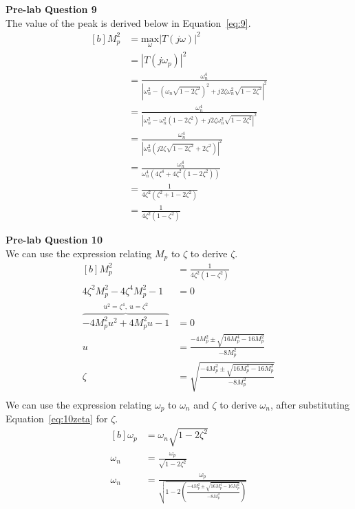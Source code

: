 \documentclass[12pt]{article}
\begin{document}
\textbf{Pre-lab Question 9} \\
The value of the peak is derived below in Equation~\ref{eq:9}.
\begin{equation} \label{eq:9}
\begin{aligned}[b]
    M_p^2 &= \underset{\omega}{\text{max}}\left| T(j\omega) \right|^2 \\
    &= \left| T(j\omega_p) \right|^2 \\
    &= \frac{\omega_n^4}{\left| \omega_n^2 - (\omega_n\sqrt{1-2\zeta^2})^2 + j2\zeta\omega_n^2\sqrt{1-2\zeta^2} \right|^2} \\
    &= \frac{\omega_n^4}{\left| \omega_n^2 - \omega_n^2(1-2\zeta^2) + j2\zeta\omega_n^2\sqrt{1-2\zeta^2} \right|^2} \\
    &= \frac{\omega_n^4}{\left| \omega_n^2 \left( j2\zeta\sqrt{1-2\zeta^2} + 2\zeta^2 \right) \right|^2} \\
    &= \frac{\omega_n^4}{\omega_n^4 (4\zeta^4 + 4\zeta^2 (1-2\zeta^2))} \\
    &= \frac{1}{4\zeta^2 (\zeta^2 + 1 - 2\zeta^2)} \\
    &= \frac{1}{4\zeta^2 (1 - \zeta^2)}
\end{aligned}
\end{equation}

\textbf{Pre-lab Question 10} \\
We can use the expression relating $M_p$ to $\zeta$ to derive $\zeta$.
\begin{equation} \label{eq:10zeta}
\begin{aligned}[b]
    M_p^2 &= \frac{1}{4\zeta^2 (1 - \zeta^2)} \\
    4\zeta^2 M_p^2 - 4\zeta^4 M_p^2 - 1 &= 0 \\
    \overbrace{-4 M_p^2 u^2 + 4 M_p^2 u - 1}^{u^2 = \zeta^4, \ u = \zeta^2} &= 0 \\
    u &= \frac{-4 M_p^2 \pm \sqrt{16 M_p^4 - 16 M_p^2}}{-8 M_p^2} \\
    \zeta &= \sqrt{\frac{-4 M_p^2 \pm \sqrt{16 M_p^4 - 16 M_p^2}}{-8 M_p^2}} \\
\end{aligned}
\end{equation}
We can use the expression relating $\omega_p$ to $\omega_n$ and $\zeta$ to derive $\omega_n$, after substituting Equation~\ref{eq:10zeta} for $\zeta$.
\begin{equation}
\begin{aligned}[b]
    \omega_p &= \omega_n \sqrt{1 - 2\zeta^2} \\
    \omega_n &= \frac{\omega_p}{\sqrt{1 - 2\zeta^2}} \\
    \omega_n &= \frac{\omega_p}{\sqrt{1 - 2 \left( \frac{-4 M_p^2 \pm \sqrt{16 M_p^4 - 16 M_p^2}}{-8 M_p^2} \right)}}
\end{aligned}
\end{equation}
\end{document}
